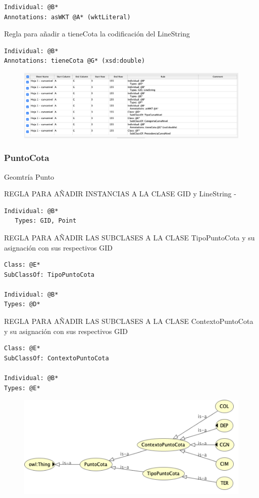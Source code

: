 \begin{lstlisting}
Individual: @B*
Annotations: asWKT @A* (wktLiteral)
\end{lstlisting}

Regla para añadir a tieneCota la codificación del LineString

\begin{lstlisting}
Individual: @B*
Annotations: tieneCota @G* (xsd:double)
\end{lstlisting}

\begin{figure}[H]
	\centering
	\includegraphics[width=0.7\linewidth]{imagenes/capitulo4/reglas-curvanivel}
	\caption{}
	\label{fig:reglas-curvanivel}
\end{figure}


\subsubsection{PuntoCota}

Geomtría Punto

REGLA PARA AÑADIR INSTANCIAS A LA CLASE GID y LineString - 
\begin{lstlisting}
Individual: @B*
   Types: GID, Point
\end{lstlisting}


REGLA PARA AÑADIR LAS SUBCLASES A LA CLASE TipoPuntoCota y su asignación con sus respectivos GID

\begin{lstlisting}
Class: @E*
SubClassOf: TipoPuntoCota

Individual: @B*
Types: @D*
\end{lstlisting}

REGLA PARA AÑADIR LAS SUBCLASES A LA CLASE ContextoPuntoCota y su asignación con sus respectivos GID

\begin{lstlisting}
Class: @E*
SubClassOf: ContextoPuntoCota

Individual: @B*
Types: @E*
\end{lstlisting}

\begin{figure}[H]
	\centering
	\includegraphics[width=0.7\linewidth]{imagenes/capitulo4/puntocota-1}
	\caption{}
	\label{fig:puntocota-1}
\end{figure}

